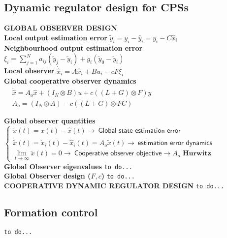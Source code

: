 \documentclass[a4paper, 12pt]{article}
\begin{document}
\subsection*{\color{red}Dynamic regulator design for CPSs}
\textbf{\color{blue}\large GLOBAL OBSERVER DESIGN}\\

\noindent
\textbf{Local output estimation error} $ \tilde{y}_i = y_i - \hat{y}_i = y_i - C \hat{x}_i $\\
\textbf{Neighbourhood output estimation error} $\xi_i = \sum_{j=1}^N {a_{ij} (\tilde{y}_j - \tilde{y}_i) + g_i(\tilde{y}_0 - \tilde{y}_i)}$\\
\textbf{Local observer} $\dot{\hat{x}}_i = A \hat{x}_i + B u_i - cF\xi_i$\\
\noindent
\textbf{Global cooperative observer dynamics} 
$\begin{aligned}
    &\dot{\hat{x}}= A_o\hat{x} + 
(I_N \otimes B) u + c ((L+G)\otimes F) y\\
&A_o= (I_N \otimes A) - c ((L+G)\otimes FC)
\end{aligned}$

\noindent
\textbf{Global observer quantities} $\begin{cases}
    \tilde{x}(t) = x(t)-\hat{x}(t) \to \ \textsf{Global state estimation error} \\
    \dot{\tilde{x}}(t) = \dot{x}_i(t) - \dot{\hat{x}}_i(t) = A_o \tilde{x}(t) \to \ \textsf{estimation error dynamics}\\
    \underset{t\to\infty}{\lim} \tilde{x}(t) = 0 \to \ \textsf{Cooperative observer objective} \to A_o \textbf{ Hurwitz}
\end{cases}$\\

\noindent
\textbf{Global Observer eigenvalues} \texttt{to do...} \\

\noindent
\textbf{Global Observer design ($F,c$)} \texttt{to do...}\\

\noindent
\textbf{\color{blue}\large COOPERATIVE DYNAMIC REGULATOR DESIGN} \texttt{to do...}\\

\subsection*{\color{red}Formation control} \texttt{to do...}
\end{document}
